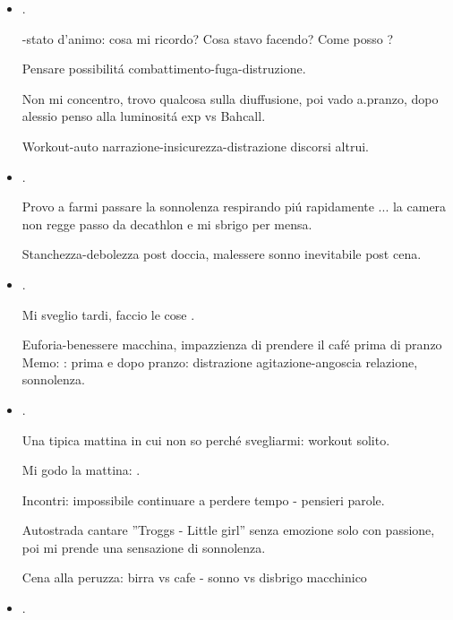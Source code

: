 \begin{itemize}
Workout: necessit\'a workout ferocia - interazioni-corpi/dominio-intenzione

\item {}.

-stato d'animo: cosa mi ricordo? Cosa stavo facendo? Come posso ?

Pensare possibilit\'a combattimento-fuga-distruzione.

Non mi concentro, trovo qualcosa sulla diuffusione, poi vado a.pranzo, dopo alessio penso alla luminosit\'a exp vs Bahcall.

Workout-auto narrazione-insicurezza-distrazione discorsi altrui.

\item {}.

Provo a farmi passare la sonnolenza respirando pi\'u rapidamente ... la camera non regge passo da decathlon e mi sbrigo per mensa.

Stanchezza-debolezza post doccia, malessere sonno inevitabile post cena.

\item {}.

Mi sveglio tardi, faccio le cose .

Euforia-benessere macchina, impazzienza di prendere il caf\'e prima di pranzo
Memo: : prima e dopo pranzo: distrazione agitazione-angoscia relazione, sonnolenza.

\item {}.

Una tipica mattina in cui non so perch\'e svegliarmi: workout solito.

Mi godo la mattina: .

Incontri: impossibile continuare a perdere tempo - pensieri parole.

Autostrada cantare ''Troggs - Little girl'' senza emozione solo con passione, poi mi prende una sensazione di sonnolenza.

Cena alla peruzza: birra vs cafe - sonno vs disbrigo macchinico

\item {}.


\end{itemize}
